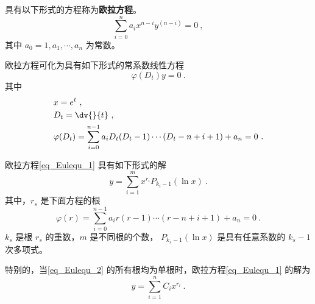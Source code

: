 

具有以下形式的方程称为\textbf{欧拉方程}。
\begin{equation}\label{eq_Eulequ_1}
\sum_{i=0}^{n}a_ix^{n-i}y^{(n-i)}=0~,
\end{equation}
其中 $a_0=1,a_1,\cdots,a_n$ 为常数。

欧拉方程可化为具有如下形式的常系数线性方程
\begin{equation}\label{eq_Eulequ_4}
\varphi(D_t)y=0~.
\end{equation}
其中
\begin{equation}
\begin{aligned}
&x=e^t~,\\
&D_t=\dv{}{t}~,\\
&\varphi(D_t)=\sum_{i=0}^{n-1}a_iD_t(D_t-1)\cdots(D_t-n+i+1)+a_n=0~.
\end{aligned}
\end{equation}

欧拉方程\autoref{eq_Eulequ_1} 具有如下形式的解
\begin{equation}\label{eq_Eulequ_6}
y=\sum_{i=1}^mx^{r_i}P_{k_i-1}(\ln x)~.
\end{equation}
其中，$r_s$ 是下面方程的根
\begin{equation}\label{eq_Eulequ_2}
\varphi(r)=\sum_{i=0}^{n-1}a_ir(r-1)\cdots(r-n+i+1)+a_n=0~.
\end{equation}
$k_s$ 是根 $r_s$ 的重数，$m$ 是不同根的个数， $P_{k_s-1}(\ln x)$ 是具有任意系数的 $k_s-1$ 次多项式。 

特别的，当\autoref{eq_Eulequ_2} 的所有根均为单根时，欧拉方程\autoref{eq_Eulequ_1} 的解为
\begin{equation}
y=\sum_{i=1}^{n}C_ix^{r_i}~.
\end{equation}

